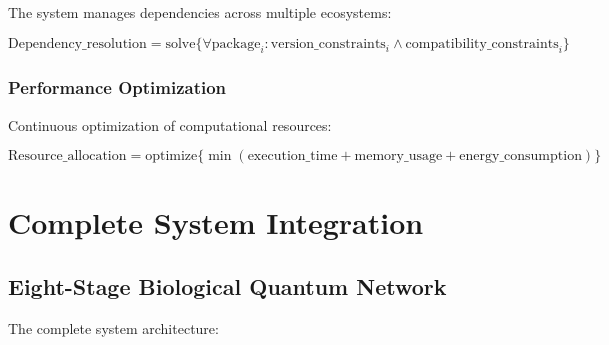 \documentclass[11pt,a4paper]{article}
\begin{document}
The system manages dependencies across multiple ecosystems:

\begin{equation}
\text{Dependency\_resolution} = \text{solve}\{\forall \text{package}_i: \text{version\_constraints}_i \land \text{compatibility\_constraints}_i\}
\end{equation}

\subsubsection{Performance Optimization}

Continuous optimization of computational resources:

\begin{equation}
\text{Resource\_allocation} = \text{optimize}\{\min(\text{execution\_time} + \text{memory\_usage} + \text{energy\_consumption})\}
\end{equation}

\section{Complete System Integration}

\subsection{Eight-Stage Biological Quantum Network}

The complete system architecture:
\end{document}
